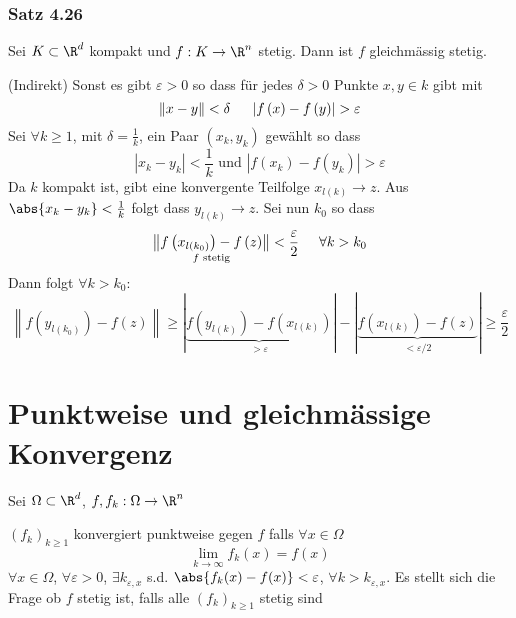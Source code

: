 \subsubsection*{Satz 4.26}
Sei $K\subset\R^d$ kompakt und $f:K\to\R^n$ stetig. Dann ist $f$ gleichmässig stetig.

\begin{beweis}{(Indirekt)}
Sonst es gibt $\varepsilon>0$ so dass für jedes $\delta>0$ Punkte $x,y\in k$ gibt mit \[\left\| {x - y} \right\| < \delta \hspace{5mm}\left| {f\left( x \right) - f\left( y \right)} \right| > \varepsilon \]
Sei $\forall k\geq 1$, mit $\delta=\frac{1}{k}$, ein Paar $\left( x_k,y_k\right)$ gewählt so dass\[\left| {{x_k} - {y_k}} \right| < \frac{1}{k}{\text{ und }}\left| {f\left( {{x_k}} \right) - f\left( {{y_k}} \right)} \right| > \varepsilon \]
Da $k$ kompakt ist, gibt eine konvergente Teilfolge $x_{l(k)}\to z$. Aus $\abs{x_k-y_k}<\frac{1}{k}$ folgt dass $y_{l(k)}\to z$. Sei nun $k_0$ so dass 
\[\mathop {\left\| {f\left( {{x_{l\left( {{k_0}} \right)}}} \right) - f\left( z \right)} \right\|}\limits_{f{\text{ stetig}}} < \frac{\varepsilon }{2}\hspace{5mm}\forall k > {k_0}\]
Dann folgt $\forall k>k_0$:
\[\left\| {f\left( {{y_{l\left( {{k_0}} \right)}}} \right) - f\left( z \right)} \right\| \ge \left| {\underbrace {f\left( {{y_{l\left( k \right)}}} \right) - f\left( {{x_{l\left( k \right)}}} \right)}_{ > \varepsilon }} \right| - \left| {\underbrace {f\left( {{x_{l\left( k \right)}}} \right) - f\left( z \right)}_{ < \varepsilon /2}} \right| \ge \frac{\varepsilon }{2}\]
\end{beweis}

\section{Punktweise und gleichmässige Konvergenz}
Sei $\Omega\subset\R^d$, $f,f_k:\Omega\to\R^n$

\begin{definition}{4.28}
$\left( f_k\right)_{k\geq 1}$ konvergiert punktweise gegen $f$ falls $\forall x\in\Omega$ \[\mathop {\lim }\limits_{k \to \infty } {f_k}\left( x \right) = f\left( x \right)\]
$\forall x\in\Omega$, $\forall\varepsilon>0$, $\exists k_{\varepsilon,x}$ s.d. $\abs{f_k(x)-f(x)}<\varepsilon$, $\forall k>k_{\varepsilon,x}$. Es stellt sich die Frage ob $f$ stetig ist, falls alle $\left( f_k\right)_{k\geq 1}$ stetig sind
\end{definition}
